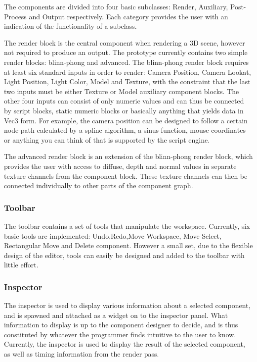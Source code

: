The components are divided into four basic subclasses: Render, Auxiliary, Post-Process and Output respectively. Each category provides the user with an indication of the functionality of a subclass. 

The render block is the central component when rendering a 3D scene, however not required to produce an output. The prototype currently contains two simple render blocks: blinn-phong and advanced. The blinn-phong render block requires at least six standard inputs in order to render: Camera Position, Camera Lookat, Light Position, Light Color, Model and Texture, with the constraint that the last two inputs must be either Texture or Model auxiliary component blocks. The other four inputs can consist of only numeric values and can thus be connected by script blocks, static numeric blocks or basically anything that yields data in Vec3 form. For example, the camera position can be designed to follow a certain node-path calculated by a spline algorithm, a sinus function, mouse coordinates or anything you can think of that is supported by the script engine. 

The advanced render block is an extension of the blinn-phong render block, which provides the user with access to diffuse, depth and normal values in separate texture channels from the component block. These texture channels can then be connected individually to other parts of the component graph.

\subsubsection{Toolbar}
The toolbar contains a set of tools that manipulate the workspace. Currently, six basic tools are implemented: Undo,Redo,Move Workspace, Move Select, Rectangular Move and Delete component. However a small set, due to the flexible design of the editor, tools can easily be designed and added to the toolbar with little effort.

\subsubsection{Inspector}
The inspector is used to display various information about a selected component, and is spawned and attached as a widget on to the inspector panel. What information to display is up to the component designer to decide, and is thus constituted by whatever the programmer finds intuitive to the user to know. Currently, the inspector is used to display the result of the selected component, as well as timing information from the render pass.
 